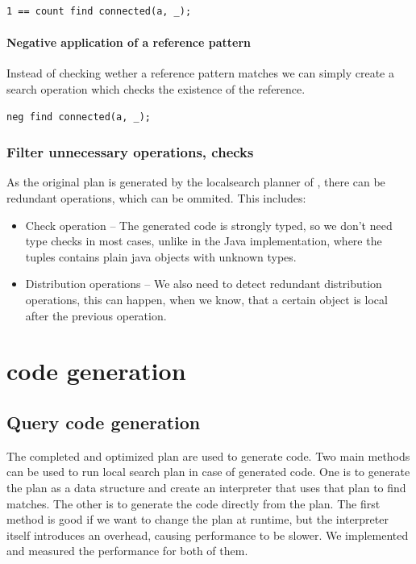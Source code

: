 \begin{lstlisting}[language = vql]
1 == count find connected(a, _);
\end{lstlisting}


\paragraph{Negative application of a reference pattern}
Instead of checking wether a reference pattern matches we can simply create a search operation which checks the existence of the reference.
\begin{lstlisting}[language = vql]
neg find connected(a, _);
\end{lstlisting}



\subsubsection{Filter unnecessary operations, checks}
As the original plan is generated by the localsearch planner of \viatra{}, there can be redundant operations, which can be ommited. This includes:

\begin{itemize}
	\item Check operation -- The generated code is strongly typed, so we don't need type checks in most cases, unlike in the Java implementation, where the tuples contains plain java objects with unknown types.
	
	\item Distribution operations -- We also need to detect redundant distribution operations, this can happen, when we know, that a certain object is local after the previous operation.
\end{itemize}



\section{\protect\cpptt{} code generation}

\subsection{Query code generation}
The completed and optimized plan are used to generate \cpp{} code. 
Two main methods can be used to run local search plan in case of generated code. 
One is to generate the plan as a data structure and create an interpreter that uses that plan to find matches. 
The other is to generate the code directly from the plan. 
The first method is good if we want to change the plan at runtime, but the interpreter itself introduces an overhead, causing performance to be slower.
We implemented and measured the performance for both of them.


